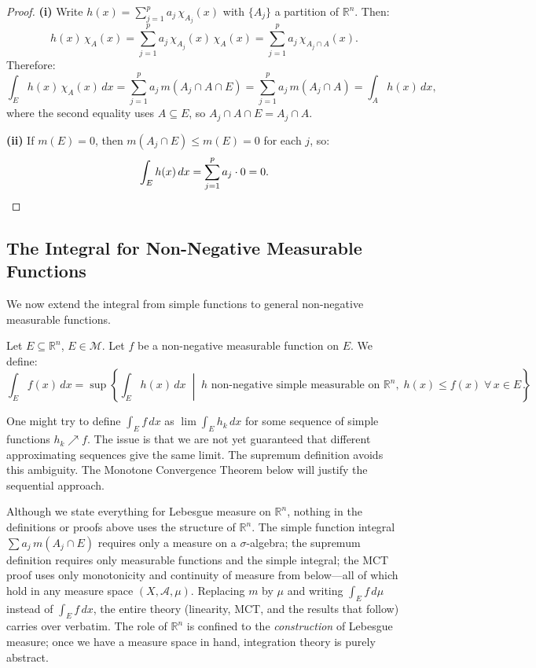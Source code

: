 \documentclass[11pt]{report}
\begin{document}
\begin{proof}
\textbf{(i)} Write $h(x) = \sum_{j=1}^{p} a_j\,\chi_{A_j}(x)$ with $\{A_j\}$ a partition of $\mathbb{R}^n$. Then:
\[
h(x)\,\chi_A(x) = \sum_{j=1}^{p} a_j\,\chi_{A_j}(x)\,\chi_A(x) = \sum_{j=1}^{p} a_j\,\chi_{A_j \cap A}(x).
\]
Therefore:
\[
\int_E h(x)\,\chi_A(x)\,dx = \sum_{j=1}^{p} a_j\,m(A_j \cap A \cap E) = \sum_{j=1}^{p} a_j\,m(A_j \cap A) = \int_A h(x)\,dx,
\]
where the second equality uses $A \subseteq E$, so $A_j \cap A \cap E = A_j \cap A$.

\textbf{(ii)} If $m(E) = 0$, then $m(A_j \cap E) \leq m(E) = 0$ for each $j$, so:
\[
\int_E h(x)\,dx = \sum_{j=1}^{p} a_j \cdot 0 = 0. \qedhere
\]
\end{proof}

\subsection{The Integral for Non-Negative Measurable Functions}

We now extend the integral from simple functions to general non-negative measurable functions.

\begin{defbox}
Let $E \subseteq \mathbb{R}^n$, $E \in \mathcal{M}$. Let $f$ be a non-negative measurable function on $E$. We define:
\[
\int_E f(x)\,dx = \sup\left\{\int_E h(x)\,dx \;\middle|\; h \text{ non-negative simple measurable on } \mathbb{R}^n,\; h(x) \leq f(x) \;\forall\, x \in E\right\}.
\]
\end{defbox}

\begin{rembox}
One might try to define $\int_E f\,dx$ as $\lim \int_E h_k\,dx$ for some sequence of simple functions $h_k \nearrow f$. The issue is that we are not yet guaranteed that different approximating sequences give the same limit. The supremum definition avoids this ambiguity. The Monotone Convergence Theorem below will justify the sequential approach.
\end{rembox}

\begin{rembox}
Although we state everything for Lebesgue measure on $\mathbb{R}^n$, nothing in the definitions or proofs above uses the structure of $\mathbb{R}^n$. The simple function integral $\sum a_j\,m(A_j \cap E)$ requires only a measure on a $\sigma$-algebra; the supremum definition requires only measurable functions and the simple integral; the MCT proof uses only monotonicity and continuity of measure from below---all of which hold in any measure space $(X, \mathcal{A}, \mu)$. Replacing $m$ by $\mu$ and writing $\int_E f\,d\mu$ instead of $\int_E f\,dx$, the entire theory (linearity, MCT, and the results that follow) carries over verbatim. The role of $\mathbb{R}^n$ is confined to the \textit{construction} of Lebesgue measure; once we have a measure space in hand, integration theory is purely abstract.
\end{rembox}
\end{document}
